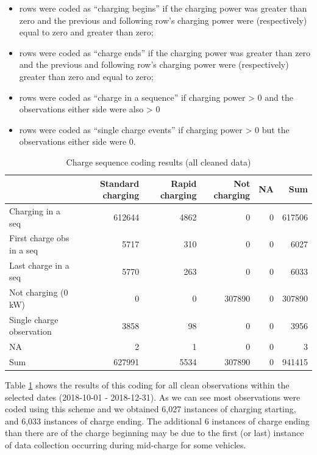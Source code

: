 \documentclass[]{article}
\providecommand{\tightlist}{%
  \setlength{\itemsep}{0pt}\setlength{\parskip}{0pt}}
\begin{document}
\begin{itemize}
\tightlist
\item
  rows were coded as ``charging begins'' if the charging power was greater than zero and the previous and following row's charging power were (respectively) equal to zero and greater than zero;
\item
  rows were coded as ``charge ends'' if the charging power was greater than zero and the previous and following row's charging power were (respectively) greater than zero and equal to zero;
\item
  rows were coded as ``charge in a sequence'' if charging power \textgreater{} 0 and the observations either side were also \textgreater{} 0
\item
  rows were coded as ``single charge events'' if charging power \textgreater{} 0 but the observations either side were 0.
\end{itemize}

\begin{table}[t]

\caption{\label{tab:seqCodeTable}Charge sequence coding results (all cleaned data)}
\centering
\begin{tabular}{l|r|r|r|r|r}
\hline
  & Standard charging & Rapid charging & Not charging & NA & Sum\\
\hline
Charging in a seq & 612644 & 4862 & 0 & 0 & 617506\\
\hline
First charge obs in a seq & 5717 & 310 & 0 & 0 & 6027\\
\hline
Last charge in a seq & 5770 & 263 & 0 & 0 & 6033\\
\hline
Not charging (0 kW) & 0 & 0 & 307890 & 0 & 307890\\
\hline
Single charge observation & 3858 & 98 & 0 & 0 & 3956\\
\hline
NA & 2 & 1 & 0 & 0 & 3\\
\hline
Sum & 627991 & 5534 & 307890 & 0 & 941415\\
\hline
\end{tabular}
\end{table}

Table \ref{tab:seqCodeTable} shows the results of this coding for all clean observations within the selected dates (2018-10-01 - 2018-12-31). As we can see most observations were coded using this scheme and we obtained 6,027 instances of charging starting, and 6,033 instances of charge ending. The additional 6 instances of charge ending than there are of the charge beginning may be due to the first (or last) instance of data collection occurring during mid-charge for some vehicles.
\end{document}
